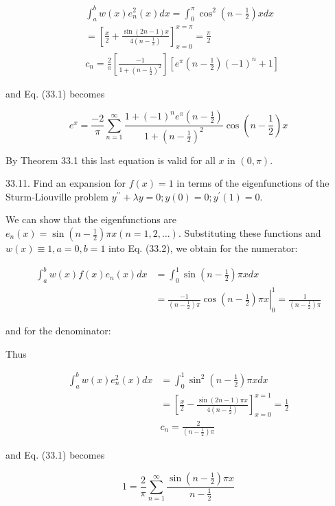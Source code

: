 \documentclass[10pt]{article}
\begin{document}
$$
\begin{aligned}
& \int_{a}^{b} w(x) e_{n}^{2}(x) d x=\int_{0}^{\pi} \cos ^{2}\left(n-\frac{1}{2}\right) x d x \\
&=\left[\frac{x}{2}+\frac{\sin (2 n-1) x}{4\left(n-\frac{1}{2}\right)}\right]_{x=0}^{x=\pi}=\frac{\pi}{2} \\
& c_{n}=\frac{2}{\pi}\left[\frac{-1}{1+\left(n-\frac{1}{2}\right)^{2}}\right]\left[e^{\pi}\left(n-\frac{1}{2}\right)(-1)^{n}+1\right]
\end{aligned}
$$

and Eq. (33.1) becomes

$$
e^{x}=\frac{-2}{\pi} \sum_{n=1}^{\infty} \frac{1+(-1)^{n} e^{\pi}\left(n-\frac{1}{2}\right)}{1+\left(n-\frac{1}{2}\right)^{2}} \cos \left(n-\frac{1}{2}\right) x
$$

By Theorem 33.1 this last equation is valid for all $x$ in $(0, \pi)$.

33.11. Find an expansion for $f(x)=1$ in terms of the eigenfunctions of the Sturm-Liouville problem $y^{\prime \prime}+\lambda y=0 ; y(0)=0 ; y^{\prime}(1)=0$.

We can show that the eigenfunctions are $e_{n}(x)=\sin \left(n-\frac{1}{2}\right) \pi x(n=1,2, \ldots)$. Substituting these functions and $w(x) \equiv 1, a=0, b=1$ into Eq. (33.2), we obtain for the numerator:

$$
\begin{aligned}
\int_{a}^{b} w(x) f(x) e_{n}(x) d x & =\int_{0}^{1} \sin \left(n-\frac{1}{2}\right) \pi x d x \\
& =\left.\frac{-1}{\left(n-\frac{1}{2}\right) \pi} \cos \left(n-\frac{1}{2}\right) \pi x\right|_{0} ^{1}=\frac{1}{\left(n-\frac{1}{2}\right) \pi}
\end{aligned}
$$

and for the denominator:

Thus

$$
\begin{aligned}
\int_{a}^{b} w(x) e_{n}^{2}(x) d x & =\int_{0}^{1} \sin ^{2}\left(n-\frac{1}{2}\right) \pi x d x \\
& =\left[\frac{x}{2}-\frac{\sin (2 n-1) \pi x}{4\left(n-\frac{1}{2}\right)}\right]_{x=0}^{x=1}=\frac{1}{2} \\
& c_{n}=\frac{2}{\left(n-\frac{1}{2}\right) \pi}
\end{aligned}
$$

and Eq. (33.1) becomes

$$
1=\frac{2}{\pi} \sum_{n=1}^{\infty} \frac{\sin \left(n-\frac{1}{2}\right) \pi x}{n-\frac{1}{2}}
$$
\end{document}
